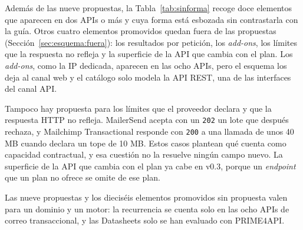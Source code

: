 Además de las nueve propuestas, la Tabla~\ref{tab:sinforma} recoge doce elementos que aparecen en dos APIs o más y cuya forma está esbozada sin contrastarla con la guía.
Otros cuatro elementos promovidos quedan fuera de las propuestas (Sección~\ref{sec:esquema:fuera}): los resultados por petición, los \textit{add-ons}, los límites que la respuesta no refleja y la superficie de la API que cambia con el plan.
Los \textit{add-ons}, como la IP dedicada, aparecen en las ocho APIs, pero el esquema los deja al canal web y el catálogo solo modela la API REST, una de las interfaces del canal API.

Tampoco hay propuesta para los límites que el proveedor declara y que la respuesta HTTP no refleja.
MailerSend acepta con un \texttt{202} un lote que después rechaza, y Mailchimp Transactional responde con \texttt{200} a una llamada de unos 40 MB cuando declara un tope de 10 MB.
Estos casos plantean qué cuenta como capacidad contractual, y esa cuestión no la resuelve ningún campo nuevo.
La superficie de la API que cambia con el plan ya cabe en v0.3, porque un \textit{endpoint} que un plan no ofrece se omite de ese plan.

Las nueve propuestas y los dieciséis elementos promovidos sin propuesta valen para un dominio y un motor: la recurrencia se cuenta solo en las ocho APIs de correo transaccional, y las Datasheets solo se han evaluado con PRIME4API.
